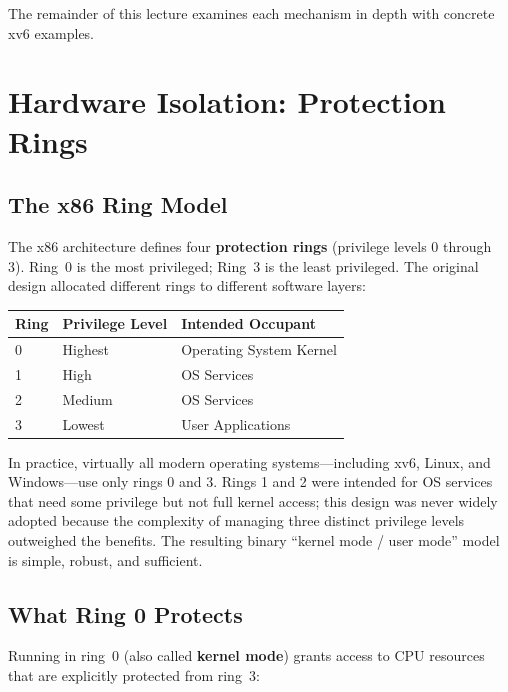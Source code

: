 \documentclass[11pt]{article}
\begin{document}
The remainder of this lecture examines each mechanism in depth with concrete xv6 examples.

\section{Hardware Isolation: Protection Rings}

\subsection{The x86 Ring Model}

The x86 architecture defines four \textbf{protection rings} (privilege levels 0 through 3).
Ring~0 is the most privileged; Ring~3 is the least privileged. The original design allocated
different rings to different software layers:

\begin{center}
\begin{tabular}{lll}
\toprule
\textbf{Ring} & \textbf{Privilege Level} & \textbf{Intended Occupant} \\
\midrule
0 & Highest & Operating System Kernel \\
1 & High    & OS Services \\
2 & Medium  & OS Services \\
3 & Lowest  & User Applications \\
\bottomrule
\end{tabular}
\end{center}

In practice, virtually all modern operating systems---including xv6, Linux, and
Windows---use only rings 0 and 3. Rings 1 and 2 were intended for OS services that need
some privilege but not full kernel access; this design was never widely adopted because the
complexity of managing three distinct privilege levels outweighed the benefits. The resulting
binary ``kernel mode / user mode'' model is simple, robust, and sufficient.

\subsection{What Ring 0 Protects}

Running in ring~0 (also called \textbf{kernel mode}) grants access to CPU resources that
are explicitly protected from ring~3:
\end{document}
